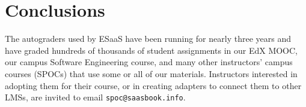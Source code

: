 \section{Conclusions}

The autograders used by ESaaS have been running for nearly three years
and have graded hundreds of thousands of student assignments in our EdX
MOOC, our campus Software Engineering course, and many other
instructors' campus courses (SPOCs) that use some or all of our materials.
Instructors interested in adopting them for their course, or in
creating adapters to connect them to other LMSs, are invited to
email \texttt{spoc@saasbook.info}.


